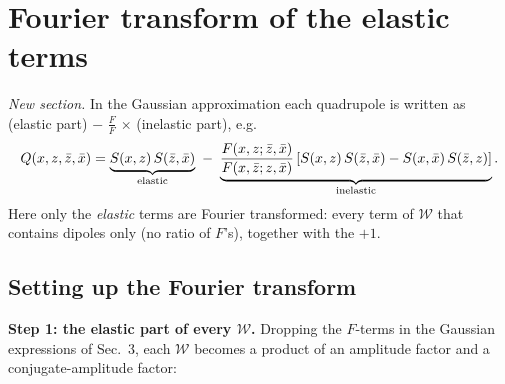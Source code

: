 \documentclass[9pt]{article}
\numberwithin{equation}{section}
\begin{document}
\section{Fourier transform of the elastic terms}\label{sec:el}
\noindent\textit{New section.} In the Gaussian approximation each quadrupole is written as (elastic part) $-$ $\frac{F}{F}$ $\times$ (inelastic part), e.g.
$$Q(x,z,\Bar{z},\Bar{x}) = \underbrace{S(x,z)\,S(\Bar{z},\Bar{x})}_{\text{elastic}}\ -\ \underbrace{\frac{F(x,z;\Bar{z},\Bar{x})}{F(x,\Bar{z};z,\Bar{x})}\left[S(x,z)\,S(\Bar{z},\Bar{x})-S(x,\Bar{x})\,S(\Bar{z},z)\right]}_{\text{inelastic}} .$$
Here only the \emph{elastic} terms are Fourier transformed: every term of $\mathcal{W}$ that contains dipoles only (no ratio of $F$'s), together with the $+1$.

\subsection{Setting up the Fourier transform}
\textbf{Step 1: the elastic part of every $\mathcal{W}$.} Dropping the $F$-terms in the Gaussian expressions of Sec.~3, each $\mathcal{W}$ becomes a product of an amplitude factor and a conjugate-amplitude factor:
\end{document}
